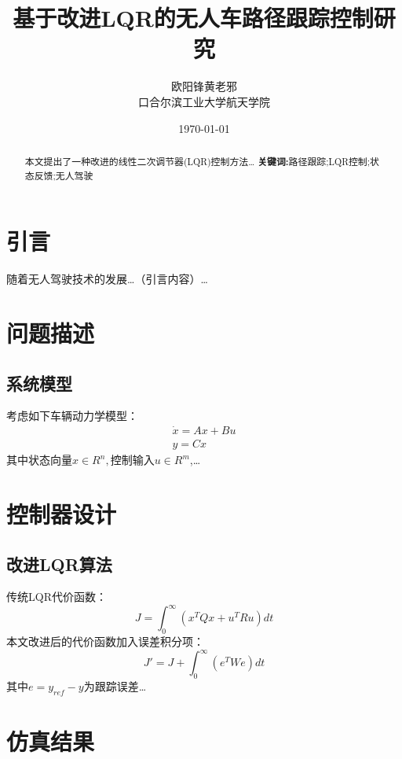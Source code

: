 \documentclass[UTF8,12pt,a4paper,oneside]{article}
\title{基于改进LQR的无人车路径跟踪控制研究}
\author{欧阳锋\quad 黄老邪\\
口合尔滨工业大学航天学院}
\date{\today}
\begin{document}
\maketitle
\newpage
\setcounter{page}{1}


\begin{abstract}
    本文提出了一种改进的线性二次调节器(LQR)控制方法\dots\newline
    \textbf{关键词:}路径跟踪;\quad LQR控制;\quad 状态反馈;\quad 无人驾驶
\end{abstract}

\section{引言}
随着无人驾驶技术的发展\dots（引言内容）\dots
\section{问题描述}
\subsection{系统模型}
考虑如下车辆动力学模型：
\begin{align}
\dot{x}=Ax+Bu \\
y=Cx
\end{align}
其中状态向量$x \in R^n,$控制输入$u\in R^m$,\dots

\section{控制器设计}
\subsection{改进LQR算法}
传统LQR代价函数：
\begin{equation}\label{eq3}
J=\int_0^\infty{(x^TQx+u^TRu)dt}
\end{equation}
本文改进后的代价函数加入误差积分项：\\
\begin{equation}\label{eq4}
    J'=J+\int_0^\infty{(e^TWe)dt}
\end{equation}
其中$e=y_{ref}-y$为跟踪误差\dots

\section{仿真结果}


\begin{table}
    \centering
    \end{table}
    
\end{document}
